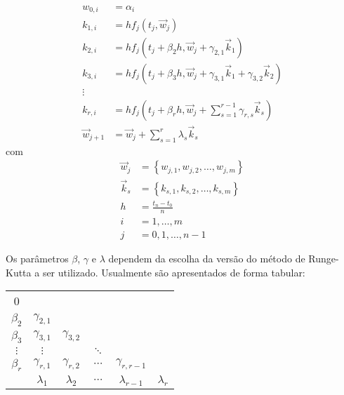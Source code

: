 \documentclass[final,5p]{elsarticle}
\numberwithin{equation}{section}
\begin{document}
    \begin{align}
        w_{0,i} &= \alpha_i \nonumber \\
        k_{1,i} &= hf_j\left(t_j,\overrightarrow{w}_j\right) \nonumber \\
        k_{2,i} &= hf_j\left(t_j + \beta_2 h,\overrightarrow{w}_j + \gamma_{2,1} \overrightarrow{k}_1\right) \nonumber \\
        k_{3,i} &= hf_j\left(t_j + \beta_3 h,\overrightarrow{w}_j + \gamma_{3,1} \overrightarrow{k}_1 + \gamma_{3,2} \overrightarrow{k}_2\right) \nonumber \\
        \vdots \nonumber \\
        k_{r,i} &= hf_j\left(t_j + \beta_r h,\overrightarrow{w}_j + \sum_{s=1}^{r-1}\gamma_{r,s} \overrightarrow{k}_s\right) \nonumber \\
        \overrightarrow{w}_{j+1} &= \overrightarrow{w}_{j} + \sum_{s=1}^{r} \lambda_s \overrightarrow{k}_s \label{eq:RKgenerica}
    \end{align}
    \noindent com
    \begin{align}
        \overrightarrow{w}_j &= \left\{ w_{j,1}, w_{j,2}, \ldots, w_{j,m} \right\} \nonumber \\
        \overrightarrow{k}_s &= \left\{ k_{s,1}, k_{s,2}, \ldots, k_{s,m} \right\} \nonumber \\
        h &= \frac{t_n-t_0}{n} \nonumber \\
        i &= 1,\ldots,m \nonumber \\
        j &= 0,1,\ldots,n-1 \nonumber
    \end{align}

    Os parâmetros $\beta$, $\gamma$ e $\lambda$ dependem da escolha da versão do método de Runge-Kutta a ser utilizado. Usualmente são apresentados de forma tabular:

    \bigskip
    \renewcommand{\arraystretch}{1.2}
    \begin{tabular}{c|ccccc}
        0         &                &                &          &                  &    \\
        $\beta_2$ & $\gamma_{2,1}$ &                &          &                  &    \\
        $\beta_3$ & $\gamma_{3,1}$ & $\gamma_{3,2}$ &          &                  &    \\
        $\vdots$  & $\vdots$       &                & $\ddots$ &                  &    \\
        $\beta_r$ & $\gamma_{r,1}$ & $\gamma_{r,2}$ & $\cdots$ & $\gamma_{r,r-1}$ &    \\
        \hline
        & $\lambda_1$    & $\lambda_2$    & $\cdots$ & $\lambda_{r-1}$  & $\lambda_r$ \\
    \end{tabular}
    \bigskip
\end{document}
